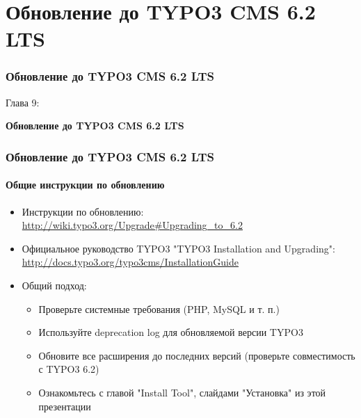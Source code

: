 %

\section{Обновление до TYPO3 CMS 6.2 LTS}
\begin{frame}[fragile]
	\frametitle{Обновление до TYPO3 CMS 6.2 LTS}

	\begin{center}\huge{Глава 9:}\end{center}
	\begin{center}\huge{\color{typo3darkgrey}\textbf{Обновление до TYPO3 CMS 6.2 LTS}}\end{center}

\end{frame}


\begin{frame}[fragile]
	\frametitle{Обновление до TYPO3 CMS 6.2 LTS}
	\framesubtitle{Общие инструкции по обновлению}

	\begin{itemize}

		\item Инструкции по обновлению:\newline
			\smaller\url{http://wiki.typo3.org/Upgrade#Upgrading_to_6.2}\normalsize
		\item Официальное руководство TYPO3 "TYPO3 Installation and Upgrading":
			\smaller\url{http://docs.typo3.org/typo3cms/InstallationGuide}\normalsize
		\item Общий подход:
			\begin{itemize}
				\item Проверьте системные требования \small(PHP, MySQL и т. п.)\normalsize
				\item Используйте deprecation log для обновляемой версии TYPO3
				\item Обновите все расширения до последних версий\newline
					\small(проверьте совместимость с TYPO3 6.2)\normalsize
				\item Ознакомьтесь с главой "Install Tool", слайдами "Установка" из этой презентации
		\end{itemize}
	\end{itemize}

\end{frame}


